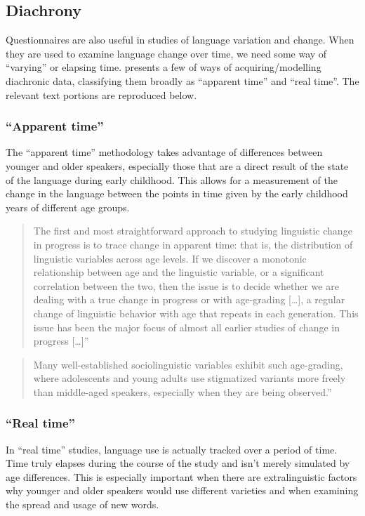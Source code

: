 \documentclass[a4paper,12pt,oneside,leqno]{scrartcl}%
\begin{document}
 
 \subsection{Diachrony}
 Questionnaires are also useful in studies of language variation and change.  
 When they are used to examine language change over time, we need some way of ``varying'' or elapsing time. 
 \citet{labov1994a} presents a few of ways of acquiring\slash{}modelling diachronic data, classifying them broadly as ``apparent time'' and ``real time''.  
 The relevant text portions are reproduced below.
  
\subsubsection{``Apparent time''}
The ``apparent time'' methodology takes advantage of differences between younger and older speakers, especially those that are a direct result of the state of the language during early childhood.  
This allows for a measurement of the change in the language between the points in time given by the early childhood years of different age groups.

\begin{quote}
The first and most straightforward approach to studying linguistic change in progress is to trace change in apparent time: that is, the distribution of linguistic variables across age levels. If we discover a monotonic relationship between age and the linguistic variable, or a significant correlation between the two, then the issue is to decide whether we are dealing with a true change in progress or with age-grading [\ldots{}], a regular change of linguistic behavior with age that repeats in each generation. This issue has been the major focus of almost all earlier studies of change in progress [\ldots{}]” \citep[pp. 45--46]{labov1994a}
\end{quote}

\begin{quote}
Many well-established sociolinguistic variables exhibit such age-grading, where adolescents and young adults use stigmatized variants more freely than middle-aged speakers, especially when they are being observed.'' 
 \citep[p. 73]{labov1994a}
\end{quote}

\subsubsection{``Real time''}
In ``real time'' studies, language use is actually tracked over a period of time.  
Time truly elapses during the course of the study and isn't merely simulated by age differences.  
This is especially important when there are extralinguistic factors why younger and older speakers would use different varieties and when examining the spread and usage of new words. 
\end{document}
